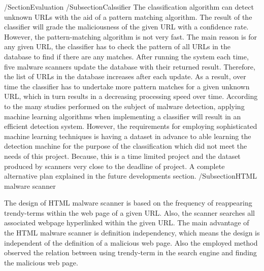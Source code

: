 /Section{Evaluation}
/Subsection{Calssifier}
The classification algorithm can detect unknown URLs with the aid of a pattern matching algorithm. The result of the classifier will grade the maliciousness of the given URL with a confidence rate. However, the pattern-matching algorithm is not very fast. The main reason is for any given URL, the classifier has to check the pattern of all URLs in the database to find if there are any matches. After running the system each time, five malware scanners update the database with their returned result. Therefore, the list of URLs in the database increases after each update. As a result, over time the classifier has to undertake more pattern matches for a given unknown URL, which in turn results in a decreasing processing speed over time.
According to the many studies performed on the subject of malware detection, applying machine learning algorithms when implementing a classifier will result in an efficient detection system. However, the requirements for employing sophisticated machine learning techniques is having a dataset in advance to able learning the detection machine for the purpose of the classification which did not meet the needs of this project. Because, this is a time limited project and the dataset produced by scanners very close to the deadline of project. A complete alternative plan explained in the future developments section. 
/Subsection{HTML malware scanner}

The design of HTML malware scanner is based on the frequency of reappearing trendy-terms within the web page of a given URL. Also, the scanner searches all associated webpage hyperlinked within the given URL. The main advantage of the HTML malware scanner is definition independency, which means the design is independent of the definition of a malicious web page. Also the employed method observed the relation between using trendy-term in the search engine and finding the malicious web page.
